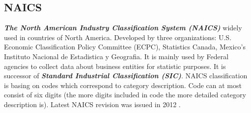 \subsection{NAICS}
\textit{\textbf{The North American Industry Classification System (NAICS)}} widely used in countries of North America. Developed by three organizations:  U.S. Economic Classification Policy Committee (ECPC), Statistics Canada, Mexico's Instituto Nacional de Estadistica y Geografia. It is mainly used by Federal agencies to collect data about business entities for statistic purposes. It is successor of \textit{\textbf{Standard Industrial Classification (SIC)}}. NAICS classification is basing on codes which correspond to category description. Code can at most consist of six digits (the more digits included in code the more detailed category description is). Latest NAICS revision was issued in 2012 \cite{15} \cite{16}.
